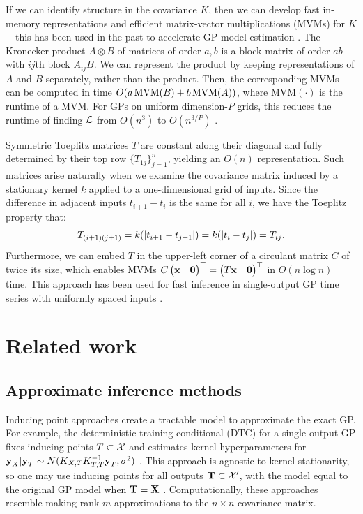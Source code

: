 \documentclass{article}
\begin{document}
If we can identify structure in the covariance $K$, then we can develop fast in-memory representations and efficient matrix-vector multiplications (MVMs) for $K$---this has been used in the past to accelerate GP model estimation \cite{gilboa2015scaling, cunningham2008fast}. The Kronecker product $A\otimes B$ of matrices of order $a,b$ is a block matrix of order $ab$ with $ij$th block $A_{ij}B$. We can represent the product by keeping representations of $A$ and $B$ separately, rather than the product. Then, the corresponding MVMs can be computed in time $O(a\operatorname{MVM}(B)+b\operatorname{MVM}(A))$, where $\text{MVM}(\cdot)$ is the runtime of a MVM. For GPs on uniform dimension-$P$ grids, this reduces the runtime of finding $\mathcal{L}$ from $O(n^3)$ to $O(n^{3/P})$ \cite{gilboa2015scaling}.

Symmetric Toeplitz matrices $T$ are constant along their diagonal and fully determined by their top row $\{T_{1j}\}_{j=1}^n$, yielding an $O(n)$ representation. Such matrices arise naturally when we examine the covariance matrix induced by a stationary kernel $k$ applied to a one-dimensional grid of inputs. Since the difference in adjacent inputs $t_{i+1}-t_{i}$ is the same for all $i$, we have the Toeplitz property that:
\[
T_{(i+1)(j+1)}=k(\left|t_{i+1} -t_{j+1}\right|)=k(\left|t_i-t_j\right|)=T_{ij}.
\]
Furthermore, we can embed $T$ in the upper-left corner of a circulant matrix $C$ of twice its size, which enables MVMs $C\begin{pmatrix} \textbf{x} & \textbf{0} \end{pmatrix}^\top=\begin{pmatrix} T\textbf{x} &\textbf{0} \end{pmatrix}^\top$ in $O(n\log n)$ time. This approach has been used for fast inference in single-output GP time series with uniformly spaced inputs \cite{cunningham2008fast}.

\section{Related work}
\label{sec:related-work}
\subsection{Approximate inference methods}

Inducing point approaches create a tractable model to approximate the exact GP. For example, the deterministic training conditional (DTC) for a single-output GP fixes inducing points $T\subset\mathcal{X}$ and estimates kernel hyperparameters for $\textbf{y}_{X}|\textbf{y}_{T}\sim N(K_{X,T}K_{T,T}^{-1}\textbf{y}_T,\sigma^2)$ \cite{quinonero2005unifying}. This approach is agnostic to kernel stationarity, so one may use inducing points for all outputs $\textbf{T}\subset \mathcal{X}'$, with the model equal to the original GP model when $\textbf{T}=\textbf{X}$ \cite{alvarez2010efficient}. Computationally, these approaches resemble making rank-$m$ approximations to the $n\times n$ covariance matrix.
\end{document}
